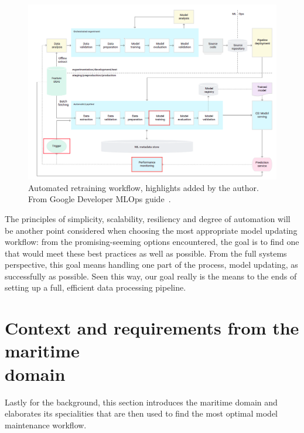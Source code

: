 \begin{figure}[ht]
\ \newline
\begin{center}
\includegraphics[width=1.0\columnwidth]{triggergooglemarked.png}
\caption{Automated retraining workflow, highlights added by the author. From Google Developer MLOps guide~\cite{googlemlops}.}
\label{triggerpipeline}
\end{center}
\end{figure}

The principles of simplicity, scalability, resiliency and degree of automation will be another point considered when choosing the most appropriate model updating workflow: from the promising-seeming options encountered, the goal is to find one that would meet these best practices as well as possible. From the full systems perspective, this goal means handling one part of the process, model updating, as successfully as possible. Seen this way, our goal really is the means to the ends of setting up a full, efficient data processing pipeline.

\section[Context and requirements from the maritime domain]{Context and requirements from the maritime\\ domain}

Lastly for the background, this section introduces the maritime domain and elaborates its specialities that are then used to find the most optimal model maintenance workflow.


